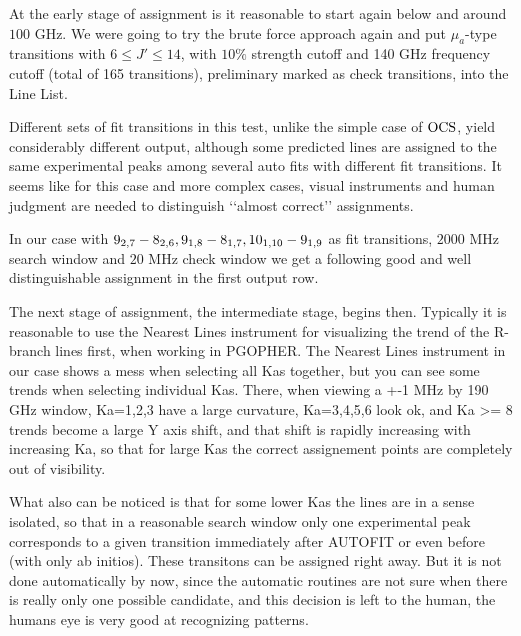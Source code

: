 \documentclass[11pt]{article}
\begin{document}
At the early stage of assignment is it reasonable to start again below and around $100$ GHz. We were going to try the brute force approach again and put $\mu_a$-type transitions with $6 \leq J' \leq 14$, with $10\%$ strength cutoff and 140 GHz frequency cutoff (total of 165 transitions), preliminary marked as check transitions, into the Line List.  


Different sets of fit transitions in this test, unlike the simple case of $\rm OCS$, yield considerably different output, although some predicted lines are assigned to the same experimental peaks among several auto fits with different fit transitions. It seems like for this case and more complex cases, visual instruments and human judgment are needed to distinguish \lq\lq{}almost correct\rq\rq{} assignments.

In our case with $\rm 9_{2,7}-8_{2,6}, 9_{1,8}-8_{1,7}, 10_{1,10}-9_{1,9}$ as fit transitions, $2000$ MHz search window and $20$ MHz check window we get a following good and well distinguishable assignment in the first output row. 

The next stage of assignment, the intermediate stage, begins then. Typically it is reasonable to use the Nearest Lines instrument for visualizing the trend of the R-branch lines first, when working in PGOPHER. The Nearest Lines instrument in our case shows a mess when selecting all Kas together, but you can see some trends when selecting individual Kas. There, when viewing a +-1 MHz by 190 GHz window, Ka=1,2,3 have a large curvature, Ka=3,4,5,6 look ok, and Ka >= 8 trends become a large Y axis shift, and that shift is rapidly increasing with increasing Ka, so that for large Kas the correct assignement points are completely out of visibility. 

What also can be noticed is that for some lower Kas the lines are in a sense isolated, so that in a reasonable search window only one experimental peak corresponds to a given transition immediately after AUTOFIT or even before (with only ab initios). These transitons can be assigned right away. But it is not done automatically by now, since the automatic routines are not sure when there is really only one possible candidate, and this decision is left to the human, the humans eye is very good at recognizing patterns. 
\end{document}

